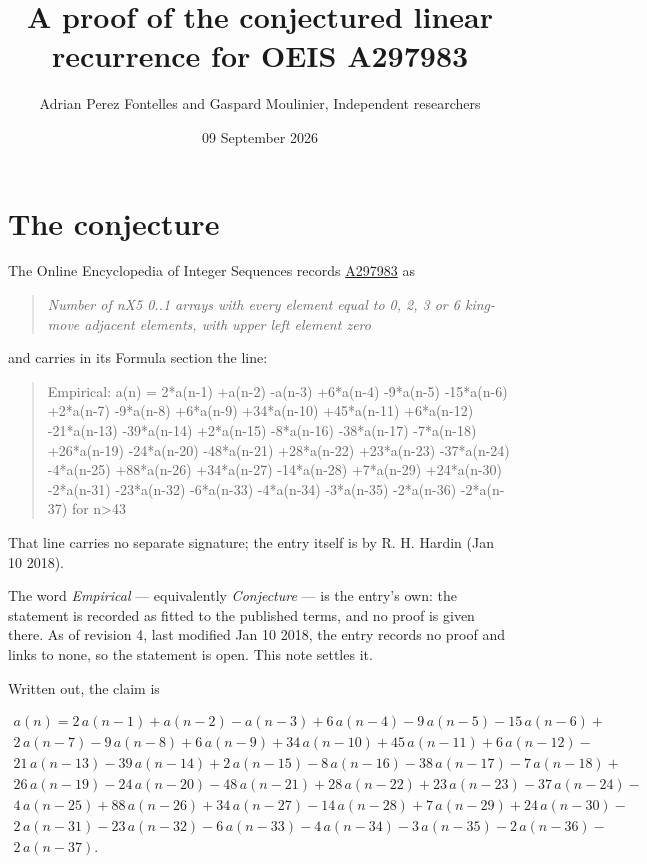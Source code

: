 \documentclass[11pt]{article}
\title{A proof of the conjectured linear recurrence for OEIS A297983}
\author{Adrian Perez Fontelles and Gaspard Moulinier, Independent researchers}
\date{09 September 2026}
\theoremstyle{definition}
\begin{document}
\maketitle
\section{The conjecture}

The Online Encyclopedia of Integer Sequences records \href{https://oeis.org/A297983}{A297983} as

\begin{quote}\itshape Number of nX5 0..1 arrays with every element equal to 0, 2, 3 or 6 king-move adjacent elements, with upper left element zero\end{quote}

and carries in its Formula section the line:

\begin{quote}\ttfamily Empirical: a(n) = 2*a(n-1) +a(n-2) -a(n-3) +6*a(n-4) -9*a(n-5) -15*a(n-6) +2*a(n-7) -9*a(n-8) +6*a(n-9) +34*a(n-10) +45*a(n-11) +6*a(n-12) -21*a(n-13) -39*a(n-14) +2*a(n-15) -8*a(n-16) -38*a(n-17) -7*a(n-18) +26*a(n-19) -24*a(n-20) -48*a(n-21) +28*a(n-22) +23*a(n-23) -37*a(n-24) -4*a(n-25) +88*a(n-26) +34*a(n-27) -14*a(n-28) +7*a(n-29) +24*a(n-30) -2*a(n-31) -23*a(n-32) -6*a(n-33) -4*a(n-34) -3*a(n-35) -2*a(n-36) -2*a(n-37) for n>43\end{quote}

That line carries no separate signature; the entry itself is by R. H. Hardin (Jan 10 2018).

The word {\itshape Empirical} --- equivalently {\itshape Conjecture} --- is the entry's own: the statement is recorded as fitted to the published terms, and no proof is given there. As of revision 4, last modified Jan 10 2018, the entry records no proof and links to none, so the statement is open. This note settles it.

Written out, the claim is

\begin{multline*} a(n) = 2\,a(n-1) + a(n-2) - a(n-3) + 6\,a(n-4) - 9\,a(n-5) - 15\,a(n-6) + \\ 2\,a(n-7) - 9\,a(n-8) + 6\,a(n-9) + 34\,a(n-10) + 45\,a(n-11) + 6\,a(n-12) - \\ 21\,a(n-13) - 39\,a(n-14) + 2\,a(n-15) - 8\,a(n-16) - 38\,a(n-17) - 7\,a(n-18) + \\ 26\,a(n-19) - 24\,a(n-20) - 48\,a(n-21) + 28\,a(n-22) + 23\,a(n-23) - 37\,a(n-24) - \\ 4\,a(n-25) + 88\,a(n-26) + 34\,a(n-27) - 14\,a(n-28) + 7\,a(n-29) + 24\,a(n-30) - \\ 2\,a(n-31) - 23\,a(n-32) - 6\,a(n-33) - 4\,a(n-34) - 3\,a(n-35) - 2\,a(n-36) - \\ 2\,a(n-37). \end{multline*}
\end{document}
